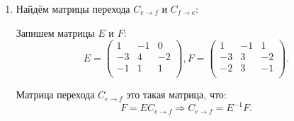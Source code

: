 \begin{enumerate}
	\item Найдём матрицы перехода $C_{e\to f}$ и $C_{f\to e}$:

	      Запишем матрицы \(E\) и \(F\):
	      \[
		      E = \begin{pmatrix}
			      1  & -1 & 0  \\
			      -3 & 4  & -2 \\
			      -1 & 1  & 1  \\
		      \end{pmatrix},
		      F = \begin{pmatrix}
			      1  & -1 & 1  \\
			      -3 & 3  & -2 \\
			      -2 & 3  & -1 \\
		      \end{pmatrix}.
	      \]

	      Матрица перехода \(C_{e \to f}\) это такая матрица, что:
	      \[
		      F = E C_{e \to f} \Rightarrow C_{e \to f} = E^{-1} F.
	      \]


\end{enumerate}
